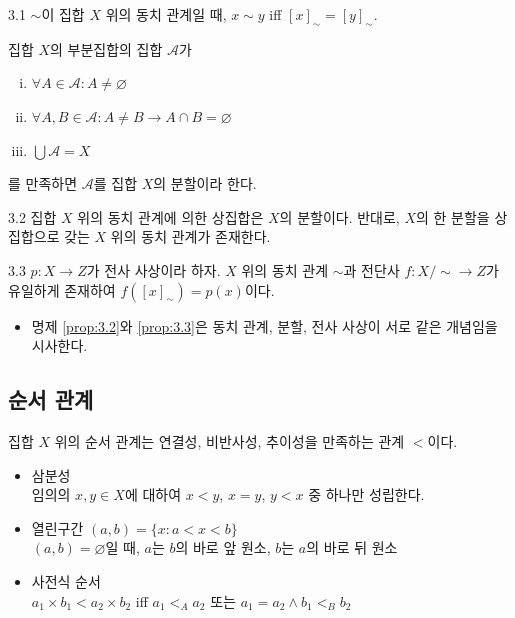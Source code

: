 \documentclass{article}
\begin{document}
\begin{prop}{}{3.1}
    $\sim$이 집합 $X$ 위의 동치 관계일 때, $x\sim y$ iff $[x]_\sim=[y]_\sim$.
\end{prop}

\noindent 집합 $X$의 부분집합의 집합 $\mathcal A$가
\begin{enumerate}[(i)]
    \item $\forall A\in\mathcal A:A\ne\varnothing$
    \item $\forall A,B\in\mathcal A:A\ne B\longrightarrow A\cap B=\varnothing$
    \item $\bigcup\mathcal A=X$
\end{enumerate}
를 만족하면 $\mathcal A$를 집합 $X$의 분할이라 한다.

\begin{prop}{}{3.2}
    집합 $X$ 위의 동치 관계에 의한 상집합은 $X$의 분할이다. 반대로, $X$의 한 분할을 상집합으로 갖는 $X$ 위의 동치 관계가 존재한다.
\end{prop}

\begin{prop}{}{3.3}
    $p:X\to Z$가 전사 사상이라 하자. $X$ 위의 동치 관계 $\sim$과 전단사 $f:X/{\sim}\to Z$가 유일하게 존재하여 $f([x]_\sim)=p(x)$이다.
\end{prop}

\begin{itemize}
    \item[$\blacktriangleright$] 명제 \ref{prop:3.2}와 \ref{prop:3.3}은 동치 관계, 분할, 전사 사상이 서로 같은 개념임을 시사한다.
\end{itemize}

\subsection{순서 관계}
집합 $X$ 위의 순서 관계는 연결성, 비반사성, 추이성을 만족하는 관계 $<$이다.

\begin{itemize}
    \item 삼분성 \\
        임의의 $x,y\in X$에 대하여 $x<y$, $x=y$, $y<x$ 중 하나만 성립한다.
    \item 열린구간 $(a,b)=\{x:a<x<b\}$ \\
        $(a,b)=\varnothing$일 때, $a$는 $b$의 바로 앞 원소, $b$는 $a$의 바로 뒤 원소
    \item 사전식 순서 \\
        $a_1\times b_1<a_2\times b_2$ iff $a_1<_Aa_2$ 또는 $a_1=a_2\wedge b_1<_Bb_2$
\end{itemize}
\end{document}

